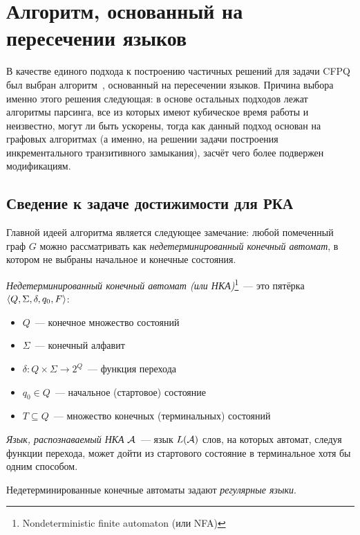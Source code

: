 \section{Алгоритм, основанный на пересечении языков}\label{section:algo_idea}

В качестве единого подхода к построению частичных решений для задачи CFPQ был выбран алгоритм~\cite{Chaudhuri08, Orachev20}, основанный на пересечении языков. Причина выбора именно этого решения следующая: в основе остальных подходов лежат алгоритмы парсинга, все из которых имеют кубическое время работы и неизвестно, могут ли быть ускорены, тогда как данный подход основан на графовых алгоритмах (а именно, на решении задачи построения инкрементального транзитивного замыкания), засчёт чего более подвержен модификациям.

\subsection{Сведение к задаче достижимости для РКА}

Главной идеей алгоритма является следующее замечание: любой помеченный граф $G$ можно рассматривать как \textit{недетерминированный конечный автомат}, в котором не выбраны начальное и конечные состояния.

\begin{definition}

  \textit{Недетерминированный конечный автомат (или НКА)}\footnote{Nondeterministic finite automaton (или NFA)}~--- это пятёрка $\langle Q, \Sigma, \delta, q_0, F \rangle$:
  \vspace{-\topsep}
  \begin{itemize}
    \setlength\itemsep{-0.1em}
    \item $Q$~--- конечное множество состояний
    \item $\Sigma$~--- конечный алфавит
    \item $\delta \colon Q \times \Sigma \to 2^Q$~--- функция перехода
    \item $q_0 \in Q$~--- начальное (стартовое) состояние
    \item $T \subseteq Q$~--- множество конечных (терминальных) состояний
  \end{itemize}

  \textit{Язык, распознаваемый НКА} $\mathcal{A}$~--- язык $L(\mathcal{A})$ слов, на которых автомат, следуя функции перехода, может дойти из стартового состояние в терминальное хотя бы одним способом.

  Недетерминированные конечные автоматы задают \textit{регулярные языки}.

\end{definition}

